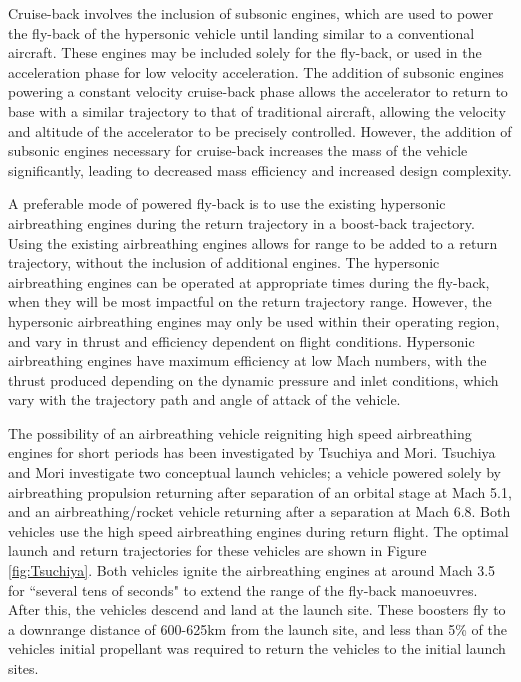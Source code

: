 Cruise-back involves the inclusion of subsonic engines, which are used to power the fly-back of the hypersonic vehicle until landing similar to a conventional aircraft. These engines may be included solely for the fly-back\cite{Hellman}, or used in the acceleration phase for low velocity acceleration\cite{Mehta2001,Tetlow1992,Wilhite1991}. The addition of subsonic engines powering a constant velocity cruise-back phase allows the accelerator to return to base with a similar trajectory to that of traditional aircraft, allowing the velocity and altitude of the accelerator to be precisely controlled. However, the addition of subsonic engines necessary for cruise-back increases the mass of the vehicle significantly, leading to decreased mass efficiency and increased design complexity\cite{Hellman}. 

A preferable mode of powered fly-back is to use the existing hypersonic airbreathing engines during the return trajectory in a boost-back trajectory. Using the existing airbreathing engines allows for range to be added to a return trajectory, without the inclusion of additional engines. The hypersonic airbreathing engines can be operated at appropriate times during the fly-back, when they will be most impactful on the return trajectory range. However, the hypersonic airbreathing engines may only be used within their operating region, and vary in thrust and efficiency dependent on flight conditions. Hypersonic airbreathing engines have maximum efficiency at low Mach numbers\cite{Preller2017b}, with the thrust produced depending on the dynamic pressure and inlet conditions, which vary with the trajectory path and angle of attack of the vehicle. 

The possibility of an airbreathing vehicle reigniting high speed airbreathing engines for short periods has been investigated by Tsuchiya and Mori\cite{Tsuchiya2005}.  Tsuchiya and Mori investigate two conceptual launch vehicles; a vehicle powered solely by airbreathing propulsion returning after separation of an orbital stage at Mach 5.1, and an airbreathing/rocket vehicle returning after a separation at Mach 6.8\cite{Tsuchiya2005}.  Both vehicles use the high speed airbreathing engines during return flight. The optimal launch and return trajectories for these vehicles are shown in Figure \ref{fig:Tsuchiya}. Both vehicles ignite the airbreathing engines at around Mach 3.5 for ``several tens of seconds" to extend the range of the fly-back manoeuvres. After this, the vehicles descend and land at the launch site. 
These boosters fly to a downrange distance of 600-625km from the launch site, and less than 5\% of the vehicles initial propellant was required to return the vehicles to the initial launch sites\cite{Tsuchiya2005}.


